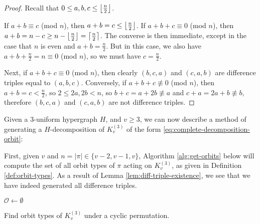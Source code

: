 \begin{proof}
Recall that $0 \leq a, b, c \leq \left\lfloor \frac{n}{2} \right\rfloor$.

If $a + b \equiv c$ (mod $n$), then $a + b = c \leq \left\lfloor \frac{n}{2} \right\rfloor$.
If $a + b + c \equiv 0$ (mod $n$), then $a + b = n-c \geq n-\left\lfloor \frac{n}{2} \right\rfloor = \left\lceil \frac{n}{2} \right\rceil$.
The converse is then immediate, except in the case that $n$ is even and $a + b = \frac{n}{2}$. But in this case, we also have $a + b + \frac{n}{2} = n \equiv 0$ (mod $n$), so we must have $c = \frac{n}{2}$.

Next, if $a + b + c \equiv 0$ (mod $n$), then clearly $(b, c, a)$ and $(c, a, b)$ are difference triples equal to $(a, b, c)$. Conversely, if $a + b + c \not\equiv 0$ (mod $n$), then $a + b = c < \frac{n}{2}$, so $2 \leq 2a, 2b < n$, so $b + c = a + 2b \not\equiv a$ and $c + a = 2a + b \not\equiv b$, therefore $(b, c, a)$ and $(c, a, b)$ are not difference triples.
\end{proof}

Given a $3$-uniform hypergraph $H$, and $v \geq 3$, we can now describe a method of generating a $H$-decomposition of $K_{v}^{(3)}$ of the form \eqref{eq:complete-decomposition-orbit}:

First, given $v$ and $n = |\pi| \in \{v-2, v-1, v\}$, Algorithm \ref{alg:get-orbits} below will compute the set of all orbit types of $\pi$ acting on $K_{v}^{(3)}$, as given in Definition \ref{def:orbit-types}.
As a result of Lemma \ref{lem:diff-triple-existence}, we see that we have indeed generated all difference triples.

\begin{algorithm}

$\mathcal{O} \gets \emptyset$\;




\;

\caption{Find orbit types of $K_v^{(3)}$ under a cyclic permutation.} \label{alg:get-orbits}
\end{algorithm}

